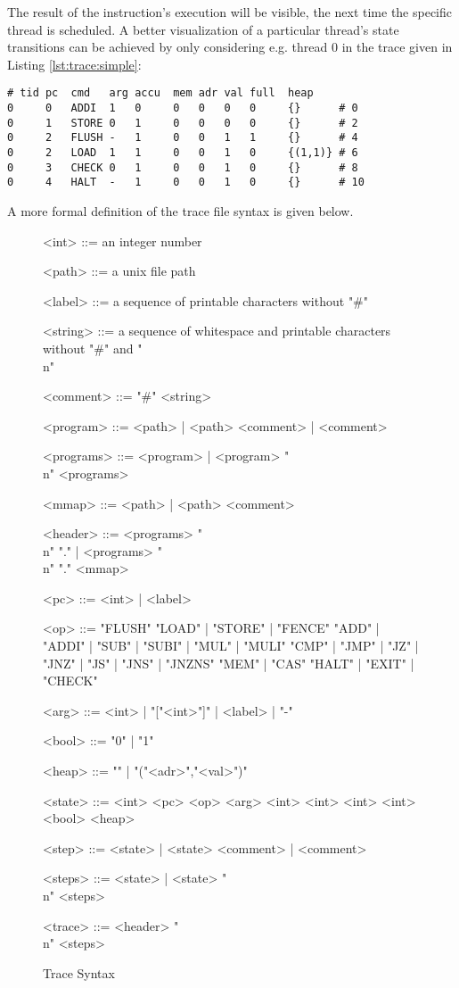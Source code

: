 The result of the instruction's execution will be visible, the next time the specific thread is scheduled.
A better visualization of a particular thread's state transitions can be achieved by only considering e.g. thread 0 in the trace given in Listing \ref{lst:trace:simple}:

\begin{lstlisting}[style=asm, xleftmargin=\parindent]
# tid pc  cmd   arg accu  mem adr val full  heap
0     0   ADDI  1   0     0   0   0   0     {}      # 0
0     1   STORE 0   1     0   0   0   0     {}      # 2
0     2   FLUSH -   1     0   0   1   1     {}      # 4
0     2   LOAD  1   1     0   0   1   0     {(1,1)} # 6
0     3   CHECK 0   1     0   0   1   0     {}      # 8
0     4   HALT  -   1     0   0   1   0     {}      # 10
\end{lstlisting}

A more formal definition of the trace file syntax is given below.

\begin{figure}[h]
\begin{grammar}
\small

<int> ::= an integer number

<path> ::= a unix file path

<label> ::= a sequence of printable characters without "#"

<string> ::= a sequence of whitespace and printable characters without "#" and "\\n"

<comment> ::= "#" <string>

<program> ::= <path> | <path> <comment> | <comment>

<programs> ::= <program> | <program> "\\n" <programs>

<mmap> ::= <path> | <path> <comment>

<header> ::= <programs> "\\n" "." | <programs> "\\n" "." <mmap>

<pc> ::= <int> | <label>

<op> ::= "FLUSH"
\alt "LOAD" | "STORE" | "FENCE"
\alt "ADD" | "ADDI" | "SUB" | "SUBI" | "MUL" | "MULI"
\alt "CMP" | "JMP" | "JZ" | "JNZ" | "JS" | "JNS" | "JNZNS"
\alt "MEM" | "CAS"
\alt "HALT" | "EXIT" | "CHECK"

<arg> ::= <int> | "["<int>"]" | <label> | "-"

<bool> ::= "0" | "1"

<heap> ::= "{}" | "{("<adr>","<val>")}"

<state> ::= <int> <pc> <op> <arg> <int> <int> <int> <int> <bool> <heap>

<step> ::= <state> | <state> <comment> | <comment>

<steps> ::= <state> | <state> "\\n" <steps>

<trace> ::= <header> "\\n" <steps>
\end{grammar}
\caption{Trace Syntax}
\label{fig:syntax:trace}
\end{figure}

